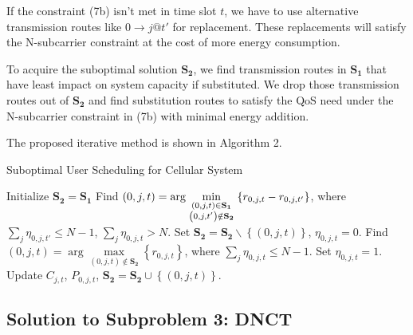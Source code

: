 \documentclass{ieeeaccess}
\begin{document}
If the constraint (7b) isn't met in time slot ${t}$, we have to use alternative transmission routes like $0 \to j@t'$ for replacement. These replacements will satisfy the N-subcarrier constraint at the cost of more energy consumption. 

To acquire the suboptimal solution ${{\mathbf{S}}_{\mathbf{2}}}$, we find transmission routes in ${{\mathbf{S}}_{\mathbf{1}}}$ that have least impact on system capacity if substituted. We drop those transmission routes out of ${{\mathbf{S}}_{\mathbf{2}}}$ and find substitution routes to satisfy the QoS need under the N-subcarrier constraint in (7b) with minimal energy addition. 

The proposed iterative method is shown in Algorithm 2.

\begin{algorithm}[h]
\caption{Suboptimal User Scheduling for Cellular System}
\label{alg:1}
\begin{algorithmic}[1]
\STATE Initialize ${{\mathbf{S}}_{\mathbf{2}}}={{\mathbf{S}}_{\mathbf{1}}}$
  \STATE Find $\left( {0,j,t} \right) = \arg \mathop {\min }\limits_{\scriptstyle \left( {0,j,t} \right) \in {{\mathbf{S}}_{\mathbf{1}}} \atop
  \scriptstyle \left( {0,j,t'} \right) \notin {{\mathbf{S}}_{\mathbf{2}}}}  \left\{ {{r_{0,j,t}} - {r_{0,j,t'}}} \right\}$, where $\sum\limits_{j} {{\eta _{0,j,t'}}}  \le N - 1$, $\sum\limits_j {{\eta _{0,j,t}} > N} $.
  \STATE Set ${{\mathbf{S}}_{\mathbf{2}}}={{\mathbf{S}}_{\mathbf{2}}}\backslash \left\{ {\left( {0,j,t} \right)} \right\}$, ${\eta _{0,j,t}} = 0$.
    \STATE Find ${\left( {0,j,t} \right) = \arg \mathop {\max }\limits_{\left( {0,j,t} \right) \notin {{\mathbf{S}}_{\mathbf{2}}}} \left\{ {{r_{0,j,t}}} \right\}}$, where ${\sum\limits_j {{\eta _{0,j,t}}}  \le N - 1}$.
    \STATE Set ${\eta _{0,j,t}} = 1$.
    \STATE Update ${C_{j,t}}$, ${P_{0,j,t}}$, ${{\mathbf{S}}_{\mathbf{2}}}={{\mathbf{S}}_{\mathbf{2}}} \cup \left\{ {\left( {0,j,t} \right)} \right\}$.
  \ENDWHILE
\ENDWHILE
\end{algorithmic}
\end{algorithm}

\subsection{Solution to \textbf{Subproblem 3: DNCT}}
\end{document}
